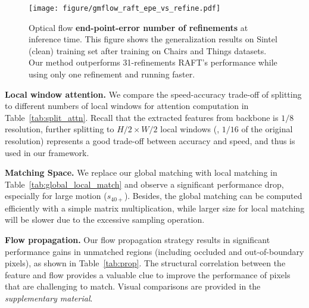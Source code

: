 \documentclass[10pt,twocolumn,letterpaper]{article}
\begin{document}
    
    
    

    
    


    
    
 
    
    
    

    
    



    
    
    
    
    
    














\begin{figure}[t]
    \centering
    \texttt{[image: figure/gmflow\_raft\_epe\_vs\_refine.pdf]}
    \vspace{-12pt}
    \caption{Optical flow \textbf{end-point-error \vs number of refinements} at inference time. This figure shows the generalization results on Sintel (clean) training set after training on Chairs and Things datasets. 
    Our method outperforms 31-refinements RAFT's performance while using only one refinement and running faster.
    }
    \label{fig:iter_vs_epe}
    \vspace{-12pt}
\end{figure}


{\bf Local window attention.} We compare the speed-accuracy trade-off of splitting to different numbers of local windows for attention computation in Table~\ref{tab:split_attn}. Recall that the extracted features from backbone is $1/8$ resolution, further splitting to $H/2 \times W /2$ local windows (\ie, $1/16$ of the original resolution) represents a good trade-off between accuracy and speed, and thus is used in our framework.

{\bf Matching Space.} We replace our global matching with local matching in Table~\ref{tab:global_local_match} and observe a significant performance drop, especially for large motion ($s_{40+}$). Besides, the global matching can be computed efficiently with a simple matrix multiplication, while larger size for local matching will be slower due to the excessive sampling operation.


{\bf Flow propagation.} Our flow propagation strategy results in significant performance gains in unmatched regions (including occluded and out-of-boundary pixels), as shown in Table~\ref{tab:prop}. The structural correlation between the feature and flow provides a valuable clue to improve the performance of pixels that are challenging to match. Visual comparisons are provided in the \emph{supplementary material}.
\end{document}
